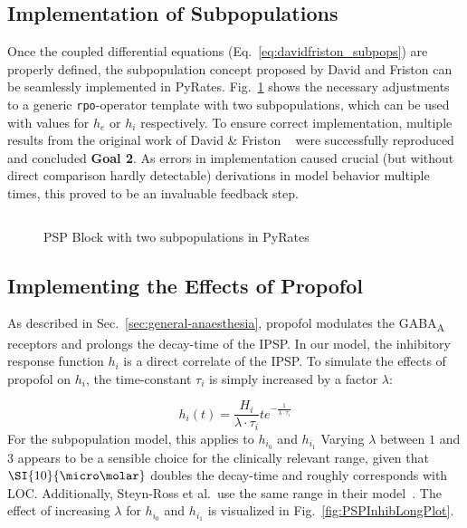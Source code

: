 \subsection{Implementation of Subpopulations}\label{subsec:implementation-of-subpopulations}
Once the coupled differential equations (Eq.~\ref{eq:davidfriston_subpops}) are properly defined,
the subpopulation concept proposed by David and Friston can be seamlessly implemented in PyRates.
Fig.~\ref{fig:subpop_pyrates} shows the necessary adjustments to a generic \texttt{rpo}-operator template
with two subpopulations,
which can be used with values for $h_e$ or $h_i$ respectively.
To ensure correct implementation,
multiple results from the original work of David \& Friston ~\cite[Fig. 4, Fig. 5, Fig. 6]{david_neural_2003}
were successfully reproduced and concluded \textbf{Goal 2}.
As errors in implementation caused crucial (but without direct comparison hardly detectable) derivations in model behavior
multiple times, this proved to be an invaluable feedback step.

\begin{figure}[H]

        \inputminted[mathescape, frame=lines, linenos, fontsize=\footnotesize, baselinestretch=1.2,
            bgcolor=LightGray, tabsize=4]
        {python3}{Chapters/Chapter_02_Theoretical_Concepts/code/psp_subpop.py}

	\caption{PSP Block with two subpopulations in PyRates}\label{fig:subpop_pyrates}
\end{figure}


\subsection{Implementing the Effects of Propofol}\label{subsec:implementing-the-effects-of-propofol}

As described in Sec.~\ref{sec:general-anaesthesia},
propofol modulates the GABA\textsubscript{A} receptors and prolongs the decay-time of the IPSP.
In our model, the inhibitory response function $h_i$ is a direct correlate of the IPSP.
To simulate the effects of propofol on $h_i$, the time-constant $\tau_i$ is simply increased by a factor
$\lambda$:

\[ h_i(t)=\frac{H_i}{\lambda \cdot \tau_i}te^{-\frac{1}{\lambda \cdot \tau_i}} \]
For the subpopulation model, this applies to $h_{i_0}$ and $h_{i_1}$
Varying $\lambda$ between $1$ and $3$ appears to be a sensible choice for the clinically relevant range,
given that $\SI{10}{\micro\molar}$ doubles the decay-time and roughly corresponds with LOC.
Additionally, Steyn-Ross et al.\ use the same range in their model~\cite{hutt_progress_2011}.
The effect of increasing $\lambda$ for $h_{i_0}$ and $h_{i_1}$ is visualized in Fig.~\ref{fig:PSPInhibLongPlot}.

